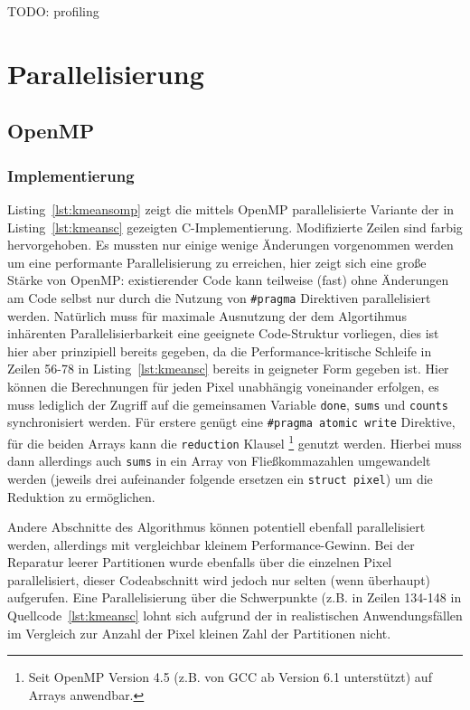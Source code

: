 \documentclass[
    bibliography=totoc, cd=lightcolor, cdmath=false, ngerman]{tudscrreprt}
\begin{document}
TODO: profiling

\chapter{Parallelisierung}

\section{OpenMP}

\subsection{Implementierung}

Listing~\ref{lst:kmeansomp} zeigt die mittels OpenMP parallelisierte Variante
der in Listing~\ref{lst:kmeansc} gezeigten C-Implementierung. Modifizierte
Zeilen sind farbig hervorgehoben. Es mussten nur einige wenige Änderungen
vorgenommen werden um eine performante Parallelisierung zu erreichen, hier
zeigt sich eine große Stärke von OpenMP: existierender Code kann teilweise
(fast) ohne Änderungen am Code selbst nur durch die Nutzung von
\texttt{\#pragma} Direktiven parallelisiert werden.  Natürlich muss für
maximale Ausnutzung der dem Algortihmus inhärenten Parallelisierbarkeit eine
geeignete Code-Struktur vorliegen, dies ist hier aber prinzipiell bereits
gegeben, da die Performance-kritische Schleife in Zeilen 56-78 in
Listing~\ref{lst:kmeansc} bereits in geigneter Form gegeben ist.
Hier können die Berechnungen für jeden Pixel unabhängig voneinander erfolgen,
es muss lediglich der Zugriff auf die gemeinsamen Variable \texttt{done},
\texttt{sums} und \texttt{counts} synchronisiert werden. Für erstere genügt
eine \texttt{\#pragma atomic write} Direktive, für die beiden Arrays kann die
\texttt{reduction} Klausel \footnote{Seit OpenMP Version 4.5 (z.B. von GCC ab
Version 6.1 unterstützt) auf Arrays anwendbar.} genutzt werden. Hierbei muss
dann allerdings auch \texttt{sums} in ein Array von Fließkommazahlen
umgewandelt werden (jeweils drei aufeinander folgende ersetzen ein
\texttt{struct pixel}) um die Reduktion zu ermöglichen.

Andere Abschnitte des Algorithmus können potentiell ebenfall parallelisiert
werden, allerdings mit vergleichbar kleinem Performance-Gewinn. Bei der
Reparatur leerer Partitionen wurde ebenfalls über die einzelnen Pixel
parallelisiert, dieser Codeabschnitt wird jedoch nur selten (wenn überhaupt)
aufgerufen. Eine Parallelisierung über die Schwerpunkte (z.B. in Zeilen 134-148
in Quellcode~\ref{lst:kmeansc} lohnt sich aufgrund der in realistischen
Anwendungsfällen im Vergleich zur Anzahl der Pixel kleinen Zahl der Partitionen
nicht.
\end{document}
